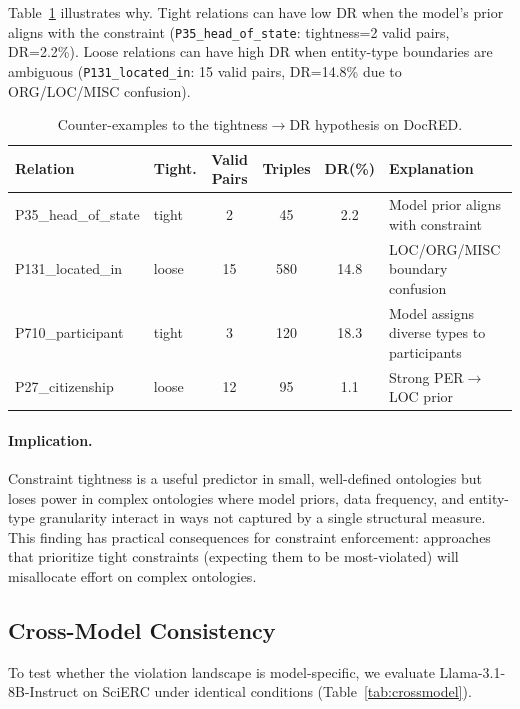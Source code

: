 \documentclass[11pt,a4paper]{article}
\begin{document}
Table~\ref{tab:counterexamples} illustrates why.
Tight relations can have low DR when the model's prior aligns with the constraint (\texttt{P35\_head\_of\_state}: tightness=2 valid pairs, DR=2.2\%).
Loose relations can have high DR when entity-type boundaries are ambiguous (\texttt{P131\_located\_in}: 15 valid pairs, DR=14.8\% due to ORG/LOC/MISC confusion).

\begin{table}[t]
\centering
\caption{Counter-examples to the tightness$\to$DR hypothesis on DocRED.}
\label{tab:counterexamples}
\small
\begin{tabular}{llcccp{4.5cm}}
\toprule
\textbf{Relation} & \textbf{Tight.} & \textbf{Valid Pairs} & \textbf{Triples} & \textbf{DR(\%)} & \textbf{Explanation} \\
\midrule
P35\_head\_of\_state & tight & 2  & 45  & 2.2  & Model prior aligns with constraint \\
P131\_located\_in    & loose & 15 & 580 & 14.8 & LOC/ORG/MISC boundary confusion \\
P710\_participant    & tight & 3  & 120 & 18.3 & Model assigns diverse types to participants \\
P27\_citizenship     & loose & 12 & 95  & 1.1  & Strong PER$\to$LOC prior \\
\bottomrule
\end{tabular}
\end{table}

\paragraph{Implication.}
Constraint tightness is a useful predictor in small, well-defined ontologies but loses power in complex ontologies where model priors, data frequency, and entity-type granularity interact in ways not captured by a single structural measure.
This finding has practical consequences for constraint enforcement: approaches that prioritize tight constraints (expecting them to be most-violated) will misallocate effort on complex ontologies.

\subsection{Cross-Model Consistency}
\label{sec:crossmodel}

To test whether the violation landscape is model-specific, we evaluate Llama-3.1-8B-Instruct on SciERC under identical conditions (Table~\ref{tab:crossmodel}).
\end{document}
